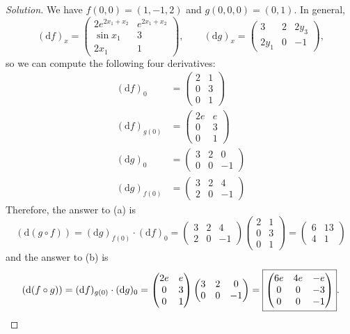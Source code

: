 \documentclass[11pt]{scrartcl}
\newenvironment{soln}{\begin{proof}[Solution]}{\end{proof}}
\begin{document}
\begin{soln}
	We have $f(0,0) = (1, -1, 2)$ and $g(0,0,0) = (0, 1)$.
	In general,
	\[(\mathrm df)_x = \begin{pmatrix}
		2e^{2x_1+x_2} & e^{2x_1 + x_2}\\
		\sin x_1 & 3\\
		2x_1 & 1
	\end{pmatrix},\qquad
	(\mathrm dg)_x = \begin{pmatrix}
		3 & 2 & 2y_3\\
		2y_1 & 0 & -1
	\end{pmatrix},\]
	so we can compute the following four derivatives:
	\begin{align*}
		(\mathrm df)_0 &= \begin{pmatrix}
			2&1\\0&3\\0&1
		\end{pmatrix}\\
		(\mathrm df)_{g(0)} &= \begin{pmatrix}
			2e&e\\0&3\\0&1
		\end{pmatrix}\\
		(\mathrm dg)_0 &= \begin{pmatrix}
			3&2&0\\0&0&-1
		\end{pmatrix}\\
		(\mathrm dg)_{f(0)} &= \begin{pmatrix}
			3&2&4\\2&0&-1
		\end{pmatrix}
	\end{align*}
	Therefore, the answer to (a) is
	\[(\mathrm d(g\circ f)) = (\mathrm dg)_{f(0)}\cdot(\mathrm df)_0
	= \begin{pmatrix}
		3&2&4\\2&0&-1
	\end{pmatrix}\begin{pmatrix}
		2&1\\0&3\\0&1
	\end{pmatrix} = \boxed{\begin{pmatrix}
		6&13\\4&1
	\end{pmatrix}}
	\]
	and the answer to (b) is
	\[(\mathrm d(f\circ g)) = (\mathrm df)_{g(0)}\cdot(\mathrm dg)_0
	= \begin{pmatrix}
		2e&e\\0&3\\0&1
	\end{pmatrix}\begin{pmatrix}
		3&2&0\\0&0&-1
	\end{pmatrix} = \boxed{\begin{pmatrix}
			6e&4e&-e\\0&0&-3\\0&0&-1
	\end{pmatrix}}.\qedhere
	\]
\end{soln}
\end{document}
